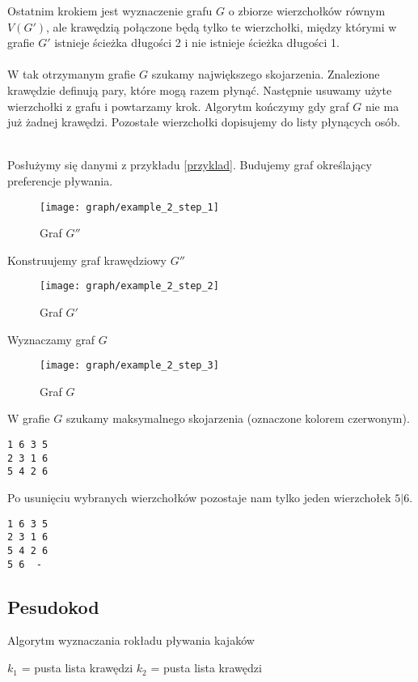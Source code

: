 \documentclass{llncs}
\begin{document}
Ostatnim krokiem jest wyznaczenie grafu $G$
o zbiorze wierzchołków równym $V(G')$, ale krawędzią
połączone będą tylko te wierzchołki, między którymi w grafie $G'$
istnieje ścieżka długości 2 i nie istnieje ścieżka długości 1.
\\\\
W tak otrzymanym grafie $G$ szukamy największego 
skojarzenia. Znalezione krawędzie definują
pary, które mogą razem płynąć. Następnie usuwamy użyte
wierzchołki z grafu i powtarzamy krok.
Algorytm kończymy gdy graf $G$ nie ma już żadnej krawędzi.
Pozostałe wierzchołki dopisujemy do listy płynących
osób.
\begin{example}~\\
Posłużymy się danymi z przykładu \ref{przyklad}.
Budujemy graf określający preferencje pływania.
\begin{figure}[H]
  \caption{Graf $G''$}
  \centering
	\texttt{[image: graph/example\_2\_step\_1]}
\end{figure}
Konstruujemy graf krawędziowy $G''$
\begin{figure}[H]
  \caption{Graf $G'$}
  \centering
	\texttt{[image: graph/example\_2\_step\_2]}
\end{figure}
Wyznaczamy graf $G$
\begin{figure}[H]
  \caption{Graf $G$}
  \centering
	\texttt{[image: graph/example\_2\_step\_3]}
\end{figure}

W grafie $G$ szukamy maksymalnego skojarzenia (oznaczone kolorem czerwonym).
\begin{lstlisting}[title=Maksymalne skojarzenie]
1 6	3 5
2 3	1 6
5 4	2 6
\end{lstlisting}
Po usunięciu wybranych wierzchołków pozostaje nam tylko jeden 
wierzchołek $5|6$.
\begin{lstlisting}[title=Możliwy rozkład pływania]
1 6	3 5
2 3	1 6
5 4	2 6
5 6	 -
\end{lstlisting}

\end{example}

\subsection{Pesudokod}
\begin{algorithm}[H]
 \caption{Algorytm wyznaczania rokładu pływania kajaków}
 $k_1$ = pusta lista krawędzi\;
 $k_2$ = pusta lista krawędzi\;
\end{algorithm}
\end{document}
